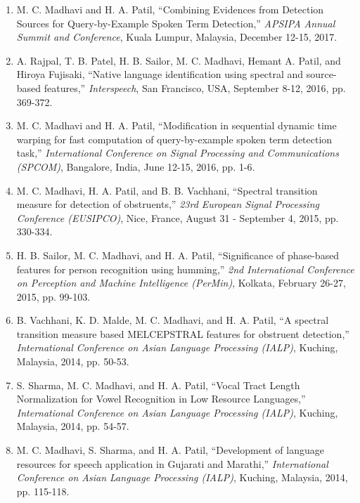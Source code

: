 \documentclass[10pt]{article}
\begin{document}
\begin{enumerate}[resume]
\item M. C. Madhavi and H. A. Patil, ``Combining Evidences from Detection Sources for Query-by-Example Spoken Term Detection,'' \textit{APSIPA Annual Summit and Conference}, Kuala Lumpur, Malaysia, December 12-15, 2017.

\item A. Rajpal, T. B. Patel, H. B. Sailor, M. C. Madhavi, Hemant A. Patil, and Hiroya Fujisaki, ``Native language identification using spectral and source-based features,'' \textit{Interspeech}, San Francisco, USA, September 8-12, 2016, pp. 369-372.

\item M. C. Madhavi and H. A. Patil, ``Modification in sequential dynamic time warping for fast computation of query-by-example spoken term detection task,'' \textit{International Conference on Signal Processing and Communications (SPCOM)}, Bangalore, India, June 12-15, 2016, pp. 1-6.

\item M. C. Madhavi, H. A. Patil, and B. B. Vachhani, ``Spectral transition measure for detection of obstruents,'' \textit{23rd European Signal Processing Conference (EUSIPCO)}, Nice, France, August 31 - September 4, 2015, pp. 330-334.

\item H. B. Sailor, M. C. Madhavi, and H. A. Patil, ``Significance of phase-based features for person recognition using humming,'' \textit{2nd International Conference on Perception and Machine Intelligence (PerMin)}, Kolkata, February 26-27, 2015, pp. 99-103.

\item B. Vachhani, K. D. Malde, M. C. Madhavi, and H. A. Patil, ``A spectral transition measure based MELCEPSTRAL features for obstruent detection,'' \textit{International Conference on Asian Language Processing (IALP)}, Kuching, Malaysia, 2014, pp. 50-53.

\item S. Sharma, M. C. Madhavi, and H. A. Patil, ``Vocal Tract Length Normalization for Vowel Recognition in Low Resource Languages,'' \textit{International Conference on Asian Language Processing (IALP)}, Kuching, Malaysia, 2014, pp. 54-57.

\item M. C. Madhavi, S. Sharma, and H. A. Patil, ``Development of language resources for speech application in Gujarati and Marathi,'' \textit{International Conference on Asian Language Processing (IALP)}, Kuching, Malaysia, 2014, pp. 115-118.


\end{enumerate}
\end{document}
